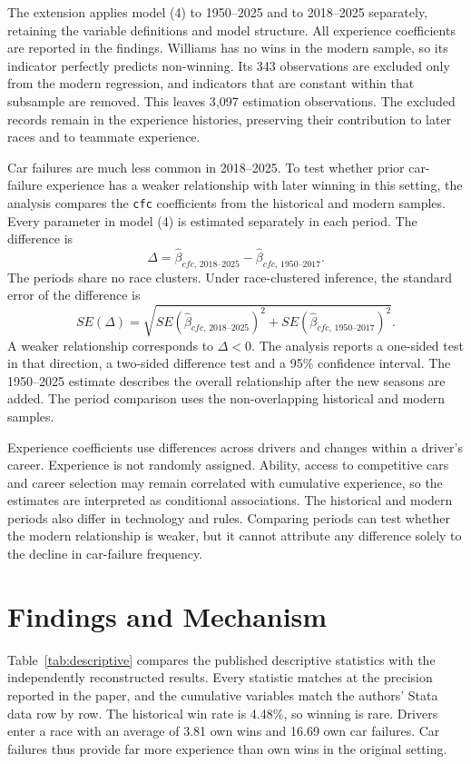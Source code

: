 \documentclass[11pt,letterpaper]{article}
\newcommand{\vname}[1]{\texttt{#1}}
\begin{document}
The extension applies model (4) to 1950--2025 and to 2018--2025 separately, retaining the variable definitions and model structure. All experience coefficients are reported in the findings. Williams has no wins in the modern sample, so its indicator perfectly predicts non-winning. Its 343 observations are excluded only from the modern regression, and indicators that are constant within that subsample are removed. This leaves 3,097 estimation observations. The excluded records remain in the experience histories, preserving their contribution to later races and to teammate experience.

Car failures are much less common in 2018--2025. To test whether prior car-failure experience has a weaker relationship with later winning in this setting, the analysis compares the \vname{cfc} coefficients from the historical and modern samples. Every parameter in model (4) is estimated separately in each period. The difference is
\[
\Delta=\widehat{\beta}_{cfc,\,2018\text{--}2025}
-\widehat{\beta}_{cfc,\,1950\text{--}2017}.
\]
The periods share no race clusters. Under race-clustered inference, the standard error of the difference is
\[
SE(\Delta)=\sqrt{
SE\!\left(\widehat{\beta}_{cfc,\,2018\text{--}2025}\right)^2
+SE\!\left(\widehat{\beta}_{cfc,\,1950\text{--}2017}\right)^2}.
\]
A weaker relationship corresponds to $\Delta<0$. The analysis reports a one-sided test in that direction, a two-sided difference test and a 95\% confidence interval. The 1950--2025 estimate describes the overall relationship after the new seasons are added. The period comparison uses the non-overlapping historical and modern samples.

Experience coefficients use differences across drivers and changes within a driver's career. Experience is not randomly assigned. Ability, access to competitive cars and career selection may remain correlated with cumulative experience, so the estimates are interpreted as conditional associations. The historical and modern periods also differ in technology and rules. Comparing periods can test whether the modern relationship is weaker, but it cannot attribute any difference solely to the decline in car-failure frequency.

\section{Findings and Mechanism}

Table~\ref{tab:descriptive} compares the published descriptive statistics with the independently reconstructed results. Every statistic matches at the precision reported in the paper, and the cumulative variables match the authors' Stata data row by row. The historical win rate is 4.48\%, so winning is rare. Drivers enter a race with an average of 3.81 own wins and 16.69 own car failures. Car failures thus provide far more experience than own wins in the original setting.
\end{document}

